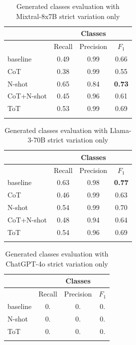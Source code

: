 \begin{table}[!h]
    \scriptsize
    \centering
    \setlength{\tabcolsep}{0.5em}
    \begin{tabular}{lccc}
    \toprule
         & & Classes & \\
     \toprule
         & Recall & Precision & $F_1$ \\
    \toprule
    
    \addlinespace
         baseline    & 0.49 & 0.99 & 0.66 \\
    	 CoT         & 0.38 & 0.99 & 0.55 \\
         N-shot      & 0.65 & 0.84 & \textbf{0.73} \\
         CoT+N-shot  & 0.45 & 0.96 & 0.61 \\
         ToT         & 0.53 & 0.99 & 0.69 \\
    \addlinespace
    \bottomrule
    \addlinespace
    \end{tabular}
    \caption{Generated classes evaluation with Mixtral-8x7B strict variation only}
    \label{tab:mixtral-classes}
\end{table}


\begin{table}[!h]
    \scriptsize
    \centering
    \setlength{\tabcolsep}{0.5em}
    \begin{tabular}{lccc}
    \toprule
    & & Classes & \\
    \toprule
         & Recall & Precision & $F_1$ \\
    \toprule
    
    \addlinespace
         baseline    & 0.63 & 0.98 & \textbf{0.77} \\
    	 CoT         & 0.46 & 0.99 & 0.63 \\
         N-shot      & 0.54 & 0.99 & 0.70 \\
         CoT+N-shot  & 0.48 & 0.94 & 0.64 \\
         ToT         & 0.54 & 0.96 & 0.69 \\
    \addlinespace
    \bottomrule
    \addlinespace
    \end{tabular}
    \caption{Generated classes evaluation with Llama-3-70B strict variation only}
    \label{tab:llama-classes}
\end{table}


\begin{table}[!h]
    \scriptsize
    \centering
    \setlength{\tabcolsep}{0.5em}
    \begin{tabular}{lccc}
    \toprule
    & & Classes & \\
    \toprule
         & Recall & Precision & $F_1$ \\
    \toprule
    
    \addlinespace
         baseline    & 0. & 0. & 0. \\
         N-shot      & 0. & 0. & 0. \\
         ToT         & 0. & 0. & 0. \\
    \addlinespace
    \bottomrule
    \addlinespace
    \end{tabular}
    \caption{Generated classes evaluation with ChatGPT-4o strict variation only}
    \label{tab:chatgpt-classes}
\end{table}

